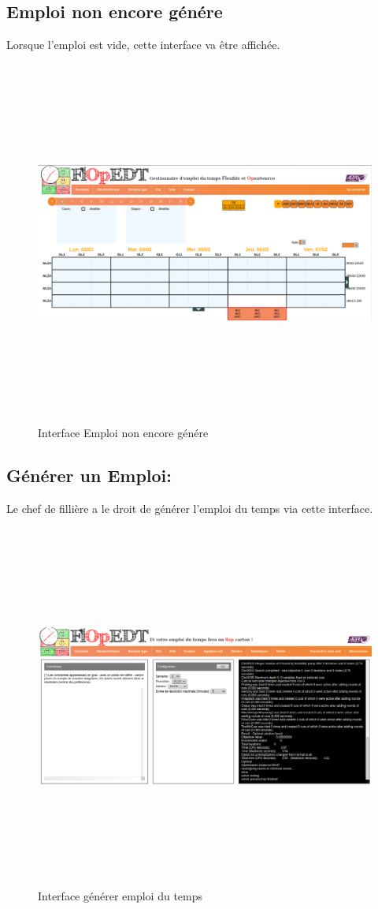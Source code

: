 \subsection*{Emploi non encore génére}
Lorsque l'emploi est vide, cette interface va être affichée.
\begin{figure}[H]
      \centering
        \includegraphics[width=15cm,height=12cm]{img/3.png}
        \caption{Interface Emploi non encore génére}
\end{figure}
\newpage
\subsection*{Générer un Emploi:}
Le chef de fillière a le droit de générer l'emploi du temps via cette interface.
\begin{figure}[H]
      \centering
        \includegraphics[width=15cm,height=12cm]{img/4.png}
        \caption{Interface générer emploi du temps}
\end{figure}
\newpage

